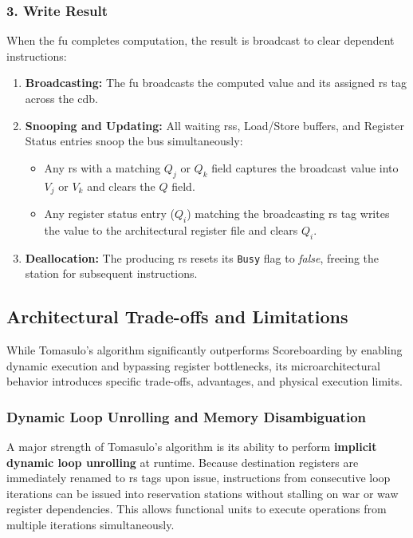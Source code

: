 \subsubsection{3. Write Result}
When the \gls{fu} completes computation, the result is broadcast to clear dependent instructions:
\begin{enumerate}
    \item \textbf{Broadcasting:} The \gls{fu} broadcasts the computed value and its assigned \gls{rs} tag across the \gls{cdb}.
    \item \textbf{Snooping and Updating:} All waiting \glspl{rs}, Load/Store buffers, and Register Status entries snoop the bus simultaneously:
    \begin{itemize}
        \item Any \gls{rs} with a matching $Q_j$ or $Q_k$ field captures the broadcast value into $V_j$ or $V_k$ and clears the $Q$ field.
        \item Any register status entry ($Q_i$) matching the broadcasting \gls{rs} tag writes the value to the architectural register file and clears $Q_i$.
    \end{itemize}
    \item \textbf{Deallocation:} The producing \gls{rs} resets its \texttt{Busy} flag to \textit{false}, freeing the station for subsequent instructions.
\end{enumerate}


\subsection{Architectural Trade-offs and Limitations}
\label{subsec:tomasulo_tradeoffs}

While Tomasulo's algorithm significantly outperforms Scoreboarding by enabling dynamic execution and bypassing register bottlenecks, its microarchitectural behavior introduces specific trade-offs, advantages, and physical execution limits.

\subsubsection{Dynamic Loop Unrolling and Memory Disambiguation}
A major strength of Tomasulo's algorithm is its ability to perform \textbf{implicit dynamic loop unrolling} at runtime. Because destination registers are immediately renamed to \gls{rs} tags upon issue, instructions from consecutive loop iterations can be issued into reservation stations without stalling on \gls{war} or \gls{waw} register dependencies. This allows functional units to execute operations from multiple iterations simultaneously.

